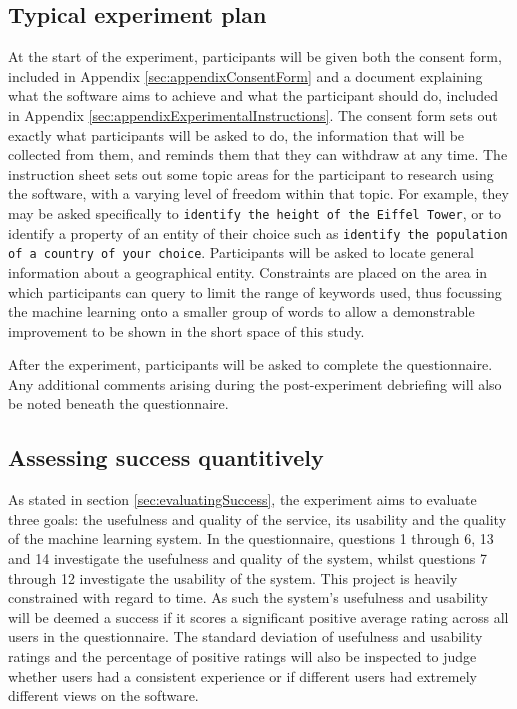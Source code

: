 \documentclass[authoryearcitations]{UoYCSproject}
\begin{document}
\subsection{Typical experiment plan}
\label{subsec:typicalExperiment}
At the start of the experiment, participants will be given both the consent form, included in Appendix \ref{sec:appendixConsentForm} and a document explaining what the software aims to achieve and what the participant should do, included in Appendix \ref{sec:appendixExperimentalInstructions}. The consent form sets out exactly what participants will be asked to do, the information that will be collected from them, and reminds them that they can withdraw at any time. The instruction sheet sets out some topic areas for the participant to research using the software, with a varying level of freedom within that topic. For example, they may be asked specifically to \texttt{identify the height of the Eiffel Tower}, or to identify a property of an entity of their choice such as \texttt{identify the population of a country of your choice}. Participants will be asked to locate general information about a geographical entity. Constraints are placed on the area in which participants can query to limit the range of keywords used, thus focussing the machine learning onto a smaller group of words to allow a demonstrable improvement to be shown in the short space of this study.

After the experiment, participants will be asked to complete the questionnaire. Any additional comments arising during the post-experiment debriefing will also be noted beneath the questionnaire.

\subsection{Assessing success quantitively}
\label{subsec:assessingLearning}
As stated in section \ref{sec:evaluatingSuccess}, the experiment aims to evaluate three goals: the usefulness and quality of the service, its usability and the quality of the machine learning system. In the questionnaire, questions 1 through 6, 13 and 14 investigate the usefulness and quality of the system, whilst questions 7 through 12 investigate the usability of the system. This project is heavily constrained with regard to time. As such the system's usefulness and usability will be deemed a success if it scores a significant positive average rating across all users in the questionnaire. The standard deviation of usefulness and usability ratings and the percentage of positive ratings will also be inspected to judge whether users had a consistent experience or if different users had extremely different views on the software.
\end{document}
